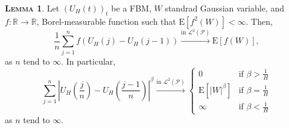 \documentclass[a4paper, twoside, 11pt]{article}
\theoremstyle{definition}
\newtheorem{lemma}[definition]{\scshape Lemma}
\begin{document}
\begin{lemma}
  Let $(U_H(t))_{t}$ be a FBM, $W$ standrad Gaussian variable, and $f: \mathbb{R}\rightarrow \mathbb{R}$, Borel-measurable function such that $\mathrm{E}[f^2(W)] < \infty$. Then, 
  \begin{equation*}
	\frac{1}{n}\sum\limits_{j=1}^n f(U_H(j)-U_H(j-1)) \overset{\text{in }\mathcal{L}^2(\mathcal{P})}{\rightarrow} \mathrm{E}[f(W)],
  \end{equation*}
  as $n$ tend to $\infty$. In particular,
  \begin{equation}
	\sum_{j=1}^n |U_H(\frac{j}{n}) - U_H(\frac{j-1}{n})|^\beta \overset{\text{in }\mathcal{L}^2(\mathcal{P})}{\rightarrow} \begin{cases}
	  0 &\mbox{if } \beta > \frac{1}{H}\\
	  \mathrm{E}[|W|^\beta] &\mbox{if } \beta = \frac{1}{H}\\
	  \infty &\mbox{if } \beta < \frac{1}{H}
	\end{cases}
	\label{sec:semilemma}
  \end{equation}
  as $n$ tend to $\infty$.
\end{lemma}
\end{document}
